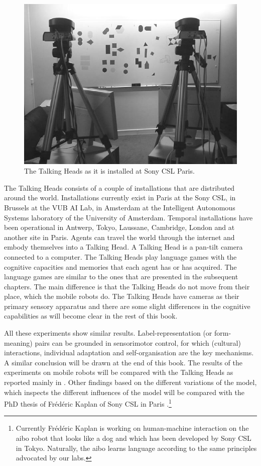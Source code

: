 \begin{figure}[t]
\centering
\includegraphics[width=12cm]{theory/th.eps}
\caption{The Talking Heads as it is installed at Sony CSL Paris.}
\label{f:theory:talkingheads}
\end{figure}

The Talking Heads consists of a couple of installations that are distributed around the world. Installations currently exist in Paris at the Sony CSL, in Brussels at the VUB AI Lab, in Amsterdam at the Intelligent Autonomous Systems laboratory of the University of Amsterdam. Temporal installations have been operational in Antwerp, Tokyo, Laussane, Cambridge, London and at another site in Paris. Agents can travel the world through the internet and embody themselves into a Talking Head. A Talking Head is a pan-tilt camera connected to a computer. The Talking Heads play language games with the cognitive capacities and memories that each agent has or has acquired. The language games are similar to the ones that are presented in the subsequent chapters. The main difference is that the Talking Heads do not move from their place, which the mobile robots do. The Talking Heads have cameras as their primary sensory apparatus and there are some slight differences in the cognitive capabilities as will become clear in the rest of this book.



All these experiments show similar results. Label-representation (or form-meaning) pairs can be grounded in sensorimotor control, for which (cultural) interactions, individual adaptation and self-organisation are the key mechanisms. A similar conclusion will be drawn at the end of this book. The results of the experiments on mobile robots will be compared with the Talking Heads as reported mainly in \citealt{steels:2000}. Other findings based on the different variations of the model, which inspects the different influences of the model will be compared with the PhD thesis of Fr\'ed\'eric Kaplan of Sony CSL in Paris \citep{kaplan:2000}.\footnote{Currently Fr\'ed\'eric Kaplan is working on human-machine interaction on the {\sc aibo} robot that looks like a dog and which has been developed by Sony CSL in Tokyo. Naturally, the {\sc aibo} learns language according to the same principles advocated by our labs.}

